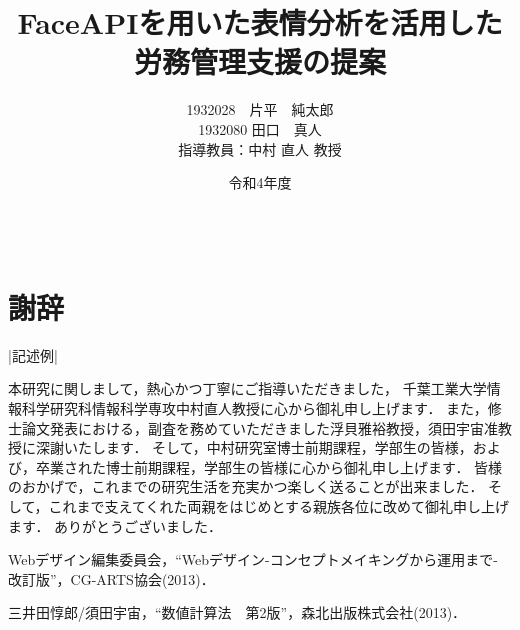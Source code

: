 \documentclass[12pt]{jsreport}%
\title{FaceAPIを用いた表情分析を活用した労務管理支援の提案}					%
\author{1932028　片平　純太郎\\1932080 田口　真人\\\normalsize 指導教員：中村 直人 教授}	%
\date{令和4年度}                                %
\begin{document}
\maketitle                          %
\tableofcontents                 %
\listoffigures				 %
\listoftables				 %

\baselineskip 20pt               %


\clearpage
{}


%








\newpage



\chapter*{　\\謝辞}
|記述例|

本研究に関しまして，熱心かつ丁寧にご指導いただきました，
千葉工業大学情報科学研究科情報科学専攻中村直人教授に心から御礼申し上げます．
また，修士論文発表における，副査を務めていただきました浮貝雅裕教授，須田宇宙准教授に深謝いたします．
そして，中村研究室博士前期課程，学部生の皆様，および，卒業された博士前期課程，学部生の皆様に心から御礼申し上げます．
皆様のおかげで，これまでの研究生活を充実かつ楽しく送ることが出来ました．
そして，これまで支えてくれた両親をはじめとする親族各位に改めて御礼申し上げます．
ありがとうございました．


\begin{thebibliography}{99}

Webデザイン編集委員会，“Webデザイン-コンセプトメイキングから運用まで-　改訂版”，CG-ARTS協会(2013)．

三井田惇郎/須田宇宙，“数値計算法　第2版”，森北出版株式会社(2013)．


\end{thebibliography}
\end{document}
